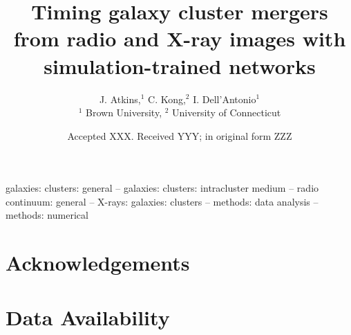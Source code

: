 \documentclass[fleqn,usenatbib]{mnras}
\title[Merger timing from radio and X-ray images]{Timing galaxy cluster
mergers from radio and X-ray images with simulation-trained networks}
\author[J. Atkins et al.]{%
J. Atkins,$^{1}$
C. Kong,$^{2}$
I. Dell'Antonio$^{1}$
\\
$^{1}$ Brown University, $^2$ University of Connecticut}
\date{Accepted XXX. Received YYY; in original form ZZZ}
\begin{document}
\label{firstpage}
\pagerange{\pageref{firstpage}--\pageref{lastpage}}
\maketitle



\begin{keywords}
galaxies: clusters: general -- galaxies: clusters: intracluster medium --
radio continuum: general -- X-rays: galaxies: clusters -- methods: data
analysis -- methods: numerical
\end{keywords}










\section*{Acknowledgements}


\section*{Data Availability}




\appendix




\bsp
\label{lastpage}
\end{document}
